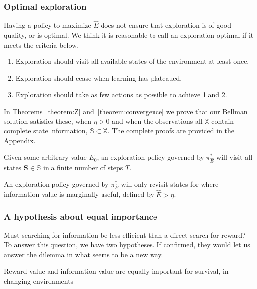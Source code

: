\subsubsection*{Optimal exploration}
Having a policy to maximize $\hat E$ does not ensure that exploration is of good quality, or is optimal. We think it is reasonable to call an exploration optimal if it meets the criteria below. 

\begin{enumerate}
	\item Exploration should visit all available states of the environment at least once.
	\item Exploration should cease when learning has plateaued.
	\item Exploration should take as few actions as possible to achieve 1 and 2.
\end{enumerate}

In Theorems~\ref{theorem:Z} and~\ref{theorem:convergence} we prove that our Bellman solution satisfies these, when $\eta > 0$ and when the observations all $\mathbb{X}$ contain complete state information, $\mathbb{S} \subset \mathbb{X}$. The complete proofs are provided in the Appendix.

\begin{theorem} 
	\label{theorem:Z} 
	Given some arbitrary value $E_0$, an exploration policy governed by $\pi^*_{\hat E}$ will visit all states $\mathbf{S} \in \mathbb{S}$ in a finite number of steps $T$.
\end{theorem}

\begin{theorem} 
	\label{theorem:convergence} 
	An exploration policy governed by $\pi^*_{\hat E}$ will only revisit states for where information value is marginally useful, defined by $\hat E > \eta$.  
\end{theorem}

\subsubsection*{A hypothesis about equal importance}
 Must searching for information be less efficient than a direct search for reward? To answer this question, we have two hypotheses. If confirmed, they would let us answer the dilemma in what seems to be a new way.

\begin{conjecture}
	Reward value and information value are equally important for survival, in changing environments 
\end{conjecture}

